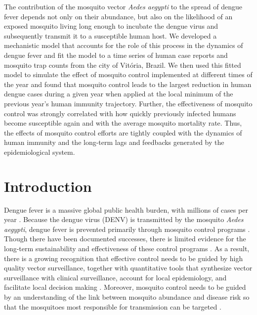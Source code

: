 \documentclass[10pt,letterpaper]{article}
\begin{document}
The contribution of the mosquito vector \emph{Aedes aegypti} to the spread of dengue fever depends not only on their abundance, but also on the likelihood of an exposed mosquito living long enough to incubate the dengue virus and subsequently transmit it to a susceptible human host.
We developed a mechanistic model that accounts for the role of this process in the dynamics of dengue fever and fit the model to a time series of human case reports and mosquito trap counts from the city of Vit\'oria, Brazil.
We then used this fitted model to simulate the effect of mosquito control implemented at different times of the year and found that mosquito control leads to the largest reduction in human dengue cases during a given year when applied at the local minimum of the previous year’s human immunity trajectory.
Further, the effectiveness of mosquito control was strongly correlated with how quickly previously infected humans become susceptible again and with the average mosquito mortality rate.
Thus, the effects of mosquito control efforts are tightly coupled with the dynamics of human immunity and the long-term lags and feedbacks generated by the epidemiological system.  


\linenumbers


\section*{Introduction}

Dengue fever is a massive global public health burden, with millions of cases per year \cite{Bhatt2013}.  
Because the dengue virus (DENV) is transmitted by the mosquito \textit{Aedes aegypti}, dengue fever is prevented primarily through mosquito control programs \cite{Achee2015}.
Though there have been documented successes, there is limited evidence for the long-term sustainability and effectiveness of these control programs \cite{Morrison2008}.
As a result, there is a growing recognition that effective control needs to be guided by high quality vector surveillance, together with quantitative tools that synthesize vector surveillance with clinical surveillance, account for local epidemiology, and facilitate local decision making \cite{Morrison2008, Scott2010b}.
Moreover, mosquito control needs to be guided by an understanding of the link between mosquito abundance and disease risk so that the mosquitoes most responsible for transmission can be targeted \cite{Scott2010a, Scott2010b}.
\end{document}

